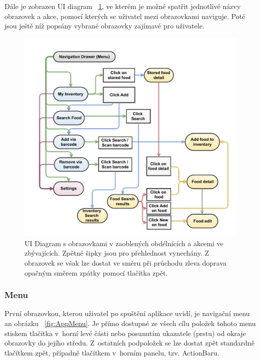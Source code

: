 \documentclass[thesis=B,czech]{FITthesis}[2013/10/20]
\begin{document}
Dále je zobrazen UI diagram ~\ref{fig:UIDiagram}, ve kterém je možné spatřit jednotlivé názvy obrazovek a akce, pomocí kterých se uživatel mezi obrazovkami naviguje. Poté jsou ještě níž popsány vybrané obrazovky zajímavé pro uživatele.

\begin{figure}[H]
  \centering
  \includegraphics[scale=0.70]{diagrams/ui.pdf}
  \caption{UI Diagram s obrazovkami v zaoblených obdélnících a akcemi ve zbývajících. Zpětné šipky jsou pro přehlednost vynechány. Z obrazovek se však lze dostat ve směru při průchodu zleva doprava opačným směrem zpátky pomocí tlačítka zpět.}
  \label{fig:UIDiagram}
\end{figure}

\clearpage

\subsubsection{Menu}

První obrazovkou, kterou uživatel po spuštění aplikace uvidí, je navigační menu an obrázku ~\ref{fig:AppMenu}. Je přímo dostupné ze všech cílu položek tohoto menu stiskem tlačítka v~horní levé části nebo posunutím ukazatele (prstu) od okraje obrazovky do jejího středu. Z~ostatních podpoložek se lze dostat zpět standardně tlačítkem zpět, případně tlačítkem v~horním panelu, tzv. ActionBaru.
\end{document}
